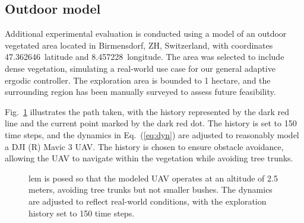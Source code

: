\documentclass[letterpaper, 10 pt, conference, twoside]{IEEEtran}
\theoremstyle{definition}
\begin{document}
\subsection{Outdoor model}\label{sec:res3}
\noindent
Additional experimental evaluation is conducted using a model of an outdoor vegetated area located in Birmensdorf, ZH, Switzerland, with coordinates 47.362646\textdegree~latitude and 8.457228\textdegree~longitude. The area was selected to include dense vegetation, simulating a real-world use case for our general adaptive ergodic controller. The exploration area is bounded to 1 hectare, %
and the surrounding region has been manually surveyed to assess future feasibility.


Fig.~\ref{fig:2} illustrates the path taken, with the history represented by the dark red line and the current point marked by the dark red dot. The history is set to 150 time steps, and the dynamics in Eq.~(\ref{eq:dyn}) are adjusted to reasonably model a DJI (R) Mavic 3 UAV. The history is chosen to ensure obstacle avoidance, allowing the UAV to navigate within the vegetation while avoiding tree trunks.

\begin{figure}[b!]
  \begin{minipage}[t!]{.66\columnwidth}
    \vspace*{-.15cm}
    \hspace*{.1cm}
  \end{minipage}\hspace*{.15cm}
  \begin{minipage}[t!]{.31\columnwidth}
    \caption[.]{\textbf{Outdoor model of a large-scale vegetated~area featuring our ergodic controller}. The~figure illustrates the UAV's trajectory over 10~000 square-meter 
    area located in Birmensdorf,~Switzerland. The~area features dense vegetation. The dark red line represents the exploration history, while the dark red dot marks the~~UAV's~~current position. The prob- 
    }
    \vspace*{-.2cm}
    \label{fig:2}
  \end{minipage}
  \vspace*{-.32cm}
  \caption*{\footnotesize lem is posed so that the modeled UAV operates at an altitude of 2.5 meters, avoiding tree trunks but not smaller bushes. The dynamics are adjusted to reflect real-world conditions, with the exploration history set to 150 time steps.}
\end{figure}
\end{document}

